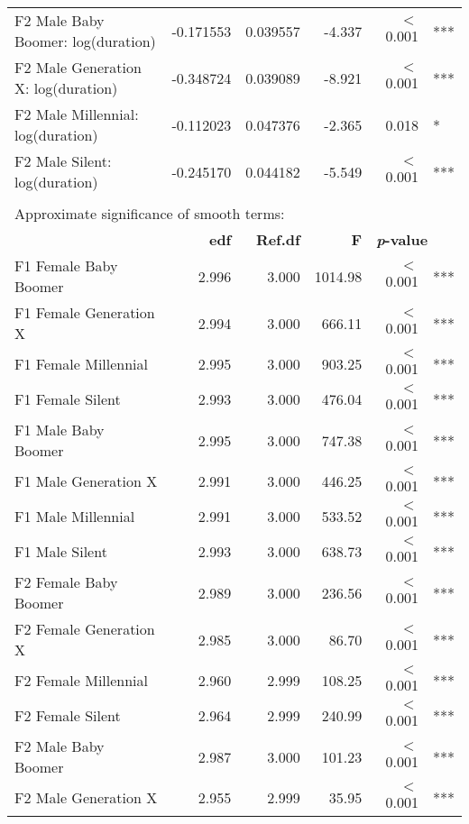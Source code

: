 \begin{table}[ht]
{{\begin{tabular}{l r r r r@{\hskip1pt} @{\hskip0pt}l }
    {}F2 Male Baby Boomer: log(duration)      & -0.171553  & 0.039557 & -4.337 & $<$ 0.001 & *** \\
    {}F2 Male Generation X: log(duration)        & -0.348724  & 0.039089 & -8.921 & $<$ 0.001 & *** \\
    {}F2 Male Millennial: log(duration)  & -0.112023  & 0.047376 & -2.365 &     0.018 & *   \\
    {}F2 Male Silent: log(duration)      & -0.245170  & 0.044182 & -5.549 & $<$ 0.001 & *** \\
    \\
    \multicolumn{6}{l}{Approximate significance of smooth terms:}\\
     & \textbf{edf} & \textbf{Ref.df} & \textbf{F} & \multicolumn{2}{l}{\textbf{\textit{p}-value}}\\
    {}{}F1 Female Baby Boomer        &    2.996 &    3.000 & 1014.98 &  $<$ 0.001 & *** \\
    {}{}F1 Female Generation X          &    2.994 &    3.000 &  666.11 &  $<$ 0.001 & *** \\
    {}{}F1 Female Millennial    &    2.995 &    3.000 &  903.25 &  $<$ 0.001 & *** \\
    {}{}F1 Female Silent        &    2.993 &    3.000 &  476.04 &  $<$ 0.001 & *** \\
    {}{}F1 Male Baby Boomer        &    2.995 &    3.000 &  747.38 &  $<$ 0.001 & *** \\
    {}{}F1 Male Generation X          &    2.991 &    3.000 &  446.25 &  $<$ 0.001 & *** \\
    {}{}F1 Male Millennial    &    2.991 &    3.000 &  533.52 &  $<$ 0.001 & *** \\
    {}{}F1 Male Silent        &    2.993 &    3.000 &  638.73 &  $<$ 0.001 & *** \\
    {}{}F2 Female Baby Boomer        &    2.989 &    3.000 &  236.56 &  $<$ 0.001 & *** \\
    {}{}F2 Female Generation X          &    2.985 &    3.000 &   86.70 &  $<$ 0.001 & *** \\
    {}{}F2 Female Millennial    &    2.960 &    2.999 &  108.25 &  $<$ 0.001 & *** \\
    {}{}F2 Female Silent        &    2.964 &    2.999 &  240.99 &  $<$ 0.001 & *** \\
    {}{}F2 Male Baby Boomer        &    2.987 &    3.000 &  101.23 &  $<$ 0.001 & *** \\
    {}{}F2 Male Generation X          &    2.955 &    2.999 &   35.95 &  $<$ 0.001 & *** \\

\end{tabular}}}
\end{table}
